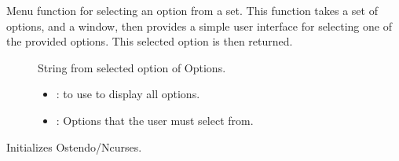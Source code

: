 \documentclass[letterpaper,10pt,english]{sphinxmanual}
\begin{document}
\begin{fulllineitems}

\begin{fulllineitems}
\label{\detokenize{index:_CPPv2N7ostendo4MenuEN7ostendo6WindowENSt6vectorINSt6stringEEE}}%
\pysigstartmultiline
{}\label{\detokenize{index:Pessumnamespaceostendo_1a7046839a0becea8636f4136c94b4cc31}}%
\pysigstopmultiline
Menu function for selecting an option from a set. This function takes a set of options, and a window, then provides a simple user interface for selecting one of the provided options. This selected option is then returned. \begin{description}
\item[{}] \leavevmode
String from selected option of Options. 

\item[{}] \leavevmode
{\hyperref[\detokenize{index:Pessumclassostendo_1_1Window}]{}} 

\item[{}] \leavevmode\begin{itemize}
\item {} 
: {\hyperref[\detokenize{index:Pessumclassostendo_1_1Window}]{}} to use to display all options. 

\item {} 
: Options that the user must select from. 

\end{itemize}

\end{description}


\end{fulllineitems}


\begin{fulllineitems}
\label{\detokenize{index:_CPPv2N7ostendo11InitOstendoEbi}}%
\pysigstartmultiline
{}\label{\detokenize{index:Pessumnamespaceostendo_1acada6eef78aaae2a103761e6b3122a7c}}%
\pysigstopmultiline
Initializes Ostendo/Ncurses. 


\end{fulllineitems}
\end{fulllineitems}
\end{document}

